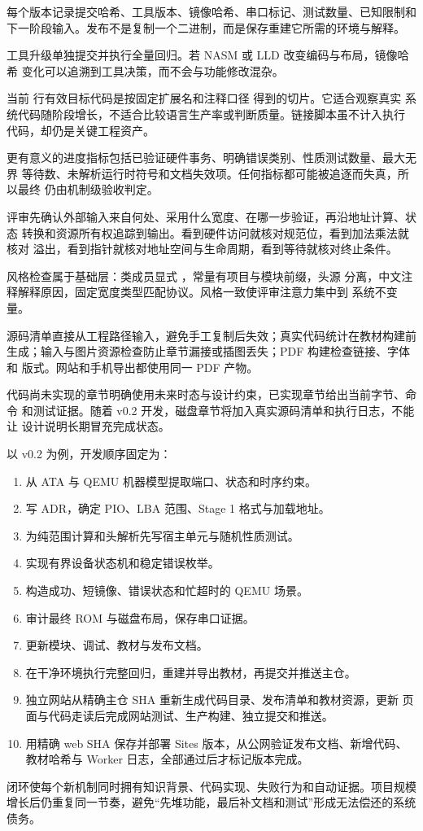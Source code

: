 每个版本记录提交哈希、工具版本、镜像哈希、串口标记、测试数量、已知限制和
下一阶段输入。发布不是复制一个二进制，而是保存重建它所需的环境与解释。

工具升级单独提交并执行全量回归。若 NASM 或 LLD 改变编码与布局，镜像哈希
变化可以追溯到工具决策，而不会与功能修改混杂。

当前 \OsProductionCodeLineCount{} 行有效目标代码是按固定扩展名和注释口径
得到的切片。它适合观察真实
系统代码随阶段增长，不适合比较语言生产率或判断质量。链接脚本虽不计入执行
代码，却仍是关键工程资产。

更有意义的进度指标包括已验证硬件事务、明确错误类别、性质测试数量、最大无界
等待数、未解析运行时符号和文档失效项。任何指标都可能被追逐而失真，所以最终
仍由机制级验收判定。

评审先确认外部输入来自何处、采用什么宽度、在哪一步验证，再沿地址计算、状态
转换和资源所有权追踪到输出。看到硬件访问就核对规范位，看到加法乘法就核对
溢出，看到指针就核对地址空间与生命周期，看到等待就核对终止条件。

风格检查属于基础层：类成员显式 ，常量有项目与模块前缀，头源
分离，中文注释解释原因，固定宽度类型匹配协议。风格一致使评审注意力集中到
系统不变量。

源码清单直接从工程路径输入，避免手工复制后失效；真实代码统计在教材构建前
生成；输入与图片资源检查防止章节漏接或插图丢失；PDF 构建检查链接、字体和
版式。网站和手机导出都使用同一 PDF 产物。

代码尚未实现的章节明确使用未来时态与设计约束，已实现章节给出当前字节、命令
和测试证据。随着 v0.2 开发，磁盘章节将加入真实源码清单和执行日志，不能让
设计说明长期冒充完成状态。

以 v0.2 为例，开发顺序固定为：

\begin{enumerate}[label=\arabic*.]
  \item 从 ATA 与 QEMU 机器模型提取端口、状态和时序约束。
  \item 写 ADR，确定 PIO、LBA 范围、Stage 1 格式与加载地址。
  \item 为纯范围计算和头解析先写宿主单元与随机性质测试。
  \item 实现有界设备状态机和稳定错误枚举。
  \item 构造成功、短镜像、错误状态和忙超时的 QEMU 场景。
  \item 审计最终 ROM 与磁盘布局，保存串口证据。
  \item 更新模块、调试、教材与发布文档。
  \item 在干净环境执行完整回归，重建并导出教材，再提交并推送主仓。
  \item 独立网站从精确主仓 SHA 重新生成代码目录、发布清单和教材资源，更新
        页面与代码走读后完成网站测试、生产构建、独立提交和推送。
  \item 用精确 web SHA 保存并部署 Sites 版本，从公网验证发布文档、新增代码、
        教材哈希与 Worker 日志，全部通过后才标记版本完成。
\end{enumerate}

闭环使每个新机制同时拥有知识背景、代码实现、失败行为和自动证据。项目规模
增长后仍重复同一节奏，避免“先堆功能，最后补文档和测试”形成无法偿还的系统
债务。
